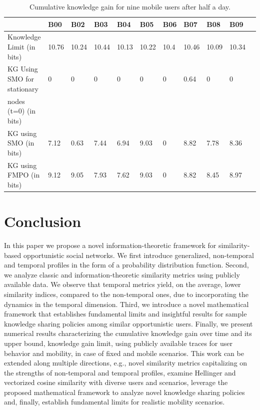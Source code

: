 \documentclass[12pt,epsf]{article}
\theoremstyle{definition}
\begin{document}
%
\begin{table}
\centering
\caption{Cumulative knowledge gain for nine mobile users after half a day.}{} \label{tab:Infocom} 
\begin{tabular}[!tp]{|l|l|l|l|l|l|l|l|l|l|l|}
\hline
       &B00& B02 & B03 & B04 & B05 & B06 & B07 & B08 & B09\\
     

\hline
Knowledge Limit (in bits) &  10.76& 10.24 & 10.44 &  10.13   & 10.22   &  10.4  &  10.46  & 10.09 &  10.34 \\
\hline
KG Using SMO for stationary   &0  & 0& 0 &0& 0 & 0 & 0.64 &0 &0 \\
nodes (t=0) (in bits)         &   &  &   & &   &   &      &  &  \\
\hline

KG using SMO (in bits)  &7.12  & 0.63& 7.44 &6.94& 9.03 & 0 & 8.82 &7.78 &8.36 \\
\hline
KG using FMPO (in bits) & 9.12 &9.05	&	7.93&	7.62&	9.03	&0	&8.82	&			8.45	&		    8.97\\
     

\hline
\end{tabular}
\end{table}
\vspace{-1 cm}
\section{Conclusion}
\vspace{-0.3 cm}
In this paper we propose a novel information-theoretic framework 
for similarity-based opportunistic social networks.
We first introduce generalized, non-temporal 
and temporal profiles in the form of a probability 
distribution function. Second, we analyze classic and information-theoretic
similarity metrics using publicly available data. We observe that temporal 
metrics yield, on the average, lower similarity 
indices, compared to the non-temporal ones, due to incorporating 
the dynamics in the temporal dimension. Third, we introduce a novel 
mathematical framework that establishes fundamental limits and insightful 
results for sample knowledge sharing policies among similar opportunistic users. 
Finally, we present numerical results characterizing the cumulative knowledge gain 
over time and its upper bound, knowledge gain limit, using publicly available 
traces for user behavior and mobility, in case of fixed and mobile
scenarios. This work can be extended along multiple directions, e.g., novel 
similarity metrics capitalizing on the strengths of non-temporal and temporal 
profiles, examine Hellinger and vectorized cosine similarity with diverse users 
and scenarios, leverage the proposed mathematical framework to analyze
novel knowledge sharing policies and, finally, establish fundamental limits for 
realistic mobility scenarios. 
\end{document}
